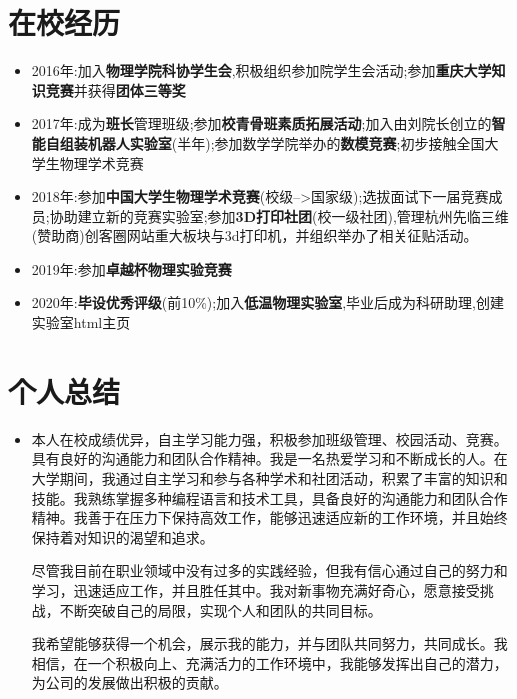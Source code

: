 \documentclass{resume}
\begin{document}
\vspace{0.5cm}

\section{在校经历}

\begin{itemize}
  \item 2016年:加入\textbf{物理学院科协学生会},积极组织参加院学生会活动;参加\textbf{重庆大学知识竞赛}并获得\textbf{团体三等奖}
  \item 2017年:成为\textbf{班长}管理班级;参加\textbf{校青骨班素质拓展活动};加入由刘院长创立的\textbf{智能自组装机器人实验室}(半年);参加数学学院举办的\textbf{数模竞赛};初步接触全国大学生物理学术竞赛
  \item 2018年:参加\textbf{中国大学生物理学术竞赛}(校级-->国家级);选拔面试下一届竞赛成员;协助建立新的竞赛实验室;参加\textbf{3D打印社团}(校一级社团),管理杭州先临三维(赞助商)创客圈网站重大板块与3d打印机，并组织举办了相关征贴活动。
  \item 2019年:参加\textbf{卓越杯物理实验竞赛}
  \item 2020年:\textbf{毕设优秀评级}(前10\%);加入\textbf{低温物理实验室},毕业后成为科研助理,创建实验室html主页
\end{itemize}


\section{个人总结}

\begin{itemize}
  \item 本人在校成绩优异，自主学习能力强，积极参加班级管理、校园活动、竞赛。具有良好的沟通能力和团队合作精神。我是一名热爱学习和不断成长的人。在大学期间，我通过自主学习和参与各种学术和社团活动，积累了丰富的知识和技能。我熟练掌握多种编程语言和技术工具，具备良好的沟通能力和团队合作精神。我善于在压力下保持高效工作，能够迅速适应新的工作环境，并且始终保持着对知识的渴望和追求。

  尽管我目前在职业领域中没有过多的实践经验，但我有信心通过自己的努力和学习，迅速适应工作，并且胜任其中。我对新事物充满好奇心，愿意接受挑战，不断突破自己的局限，实现个人和团队的共同目标。
  
  我希望能够获得一个机会，展示我的能力，并与团队共同努力，共同成长。我相信，在一个积极向上、充满活力的工作环境中，我能够发挥出自己的潜力，为公司的发展做出积极的贡献。
  
  
\end{itemize}
\end{document}
